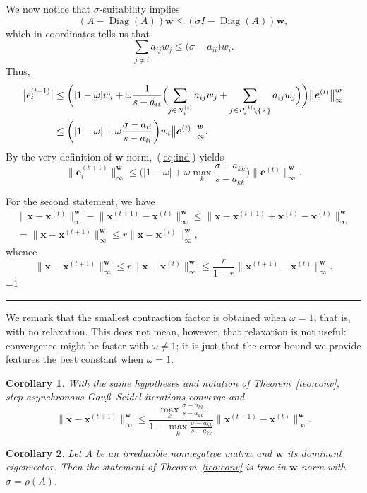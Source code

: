 \documentclass{article}
\newcommand{\Diag}[1]{\operatorname{Diag}(#1)}
\newcommand{\w}{{\bm w}}
\newcommand{\x}{{\bm x}}
\newcommand{\Gauss}{Gau\ss}
\newcommand{\1}{\mathbf 1}
\newtheorem{corollary}{Corollary}
\newcounter{noqed}
\newcommand{\qed}{ \ifmmode\mbox{ }\fi\rule[-.05em]{.3em}{.7em}\setcounter{noqed}{0}}
\newenvironment{proof}[1][{}]{\noindent{\bf Proof#1. }\setcounter{noqed}{1}}{\ifnum\value{noqed}=1\qed\fi\par\medskip}
\begin{document}
\begin{proof}
We now notice that $\sigma$-suitability implies 
\[(A-\Diag A)\w \leq (\sigma I-\Diag A)\w,\]
which in coordinates tells us that
\[\sum_{j\neq i} a_{ij} w_j \leq \bigl(\sigma-a_{ii})w_i.\]
Thus,
\begin{align*}
\bigl|e_i^{(t+1)}\bigr| &\leq 
\biggl(|1-\omega|w_i +
\omega\frac1{s-a_{ii}} \Bigl(\sum_{j\in N_i^{(t)}}
a_{ij}w_j +\sum_{j\in P_i^{(t)}\setminus\{\,i\,\}} a_{ij}w_j\Bigr) 
\biggr)\bigl\|\bm e^{(t)}\bigr\|_\infty^\w\\
&\leq\biggl(|1-\omega|+
\omega\frac{\sigma-a_{ii}}{s-a_{ii}} 
\biggr)w_i\bigl\|\bm e^{(t)}\bigr\|_\infty^\w.
\end{align*}
By the very definition of $\w$-norm,~(\ref{eq:ind}) yields
\[
\bigl\| \bm e_i^{(t+1)}\bigr\|_\infty^\w\leq\biggl( 
|1-\omega|+
\omega\max_k\frac{\sigma-a_{kk}}{s-a_{kk}}\biggr)\bigl\|\bm
e^{(t)}\bigr\|_\infty^\w.
\]


For the second statement, we have
\begin{multline*}
 \bigl\| \x- \x^{(t)}\bigr\|_\infty^\w - \bigl\| \x^{(t+1)} -
 \x^{(t)}\bigr\|_\infty^\w   \leq \bigl\| \x - \x^{(t+1)} + \x^{(t)} - \x^{(t)}\bigr\|_\infty^\w\\= \bigl\|\x - \x^{(t+1)}\bigr\|_\infty^\w\leq r \bigl\|\x - \x^{(t)}\bigr\|_\infty^\w,
\end{multline*}
whence 
\[
\bigl\|\x - \x^{(t+1)}\bigr\|_\infty^\w \leq r \bigl\|\x -
\x^{(t)}\bigr\|_\infty^\w \leq\frac r{1-r} \bigl\|\x^{(t+1)} -
\x^{(t)}\bigr\|_\infty^\w.
\]
\end{proof}

We remark that the smallest contraction factor is obtained when $\omega=1$, that is, with no relaxation. This does not mean,
however, that relaxation is not useful: convergence might be faster with $\omega\neq 1$; it is just that the error bound we
provide features the best constant when $\omega=1$.

\begin{corollary}
\label{cor:bound}
With the same hypotheses and notation of Theorem~\ref{teo:conv}, step-asynchronous \Gauss--Seidel iterations converge and
\[
\bigl\|\bar\x - \x^{(t+1)}\bigr\|_\infty^\w
\leq\frac{\displaystyle \max_k\frac{\sigma
-a_{kk}}{s-a_{kk}}}{\displaystyle 1-\max_k\frac{\sigma
-a_{kk}}{s-a_{kk}}}
\bigl\|\x^{(t+1)} - \x^{(t)}\bigr\|_\infty^\w.
\]
\end{corollary}

\begin{corollary}
\label{cor:bound}
Let $A$ be an irreducible nonnegative matrix and $\w$ its dominant eigenvector. Then the statement of Theorem~\ref{teo:conv} 
is true in $\w$-norm with $\sigma=\rho(A)$.
\end{corollary}
\end{document}

